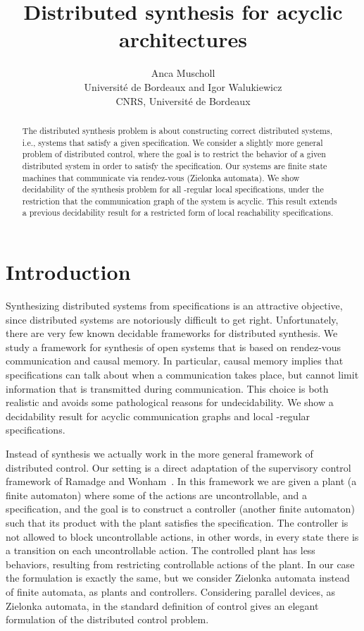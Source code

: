 \documentclass[10pt,a4paper]{article}
\title{Distributed synthesis for acyclic architectures}
\author{Anca Muscholl\\ Universit\'e de Bordeaux and Igor Walukiewicz\\CNRS, Universit\'e de Bordeaux}
\newcommand{\igw}[1]{}
\begin{document}
\maketitle

\begin{abstract}
  The distributed synthesis problem is about constructing correct
  distributed systems, i.e., systems that satisfy a given
  specification. We consider  a slightly more general problem of
  distributed control, where the goal is to restrict the behavior
  of a given distributed system in order to satisfy the
  specification. Our systems are finite state machines that
  communicate via rendez-vous (Zielonka automata). We show
  decidability of the synthesis problem for all -regular local
  specifications, under the restriction that the communication graph
  of the system is acyclic. This result extends a previous
  decidability result for a restricted form of local reachability 
  specifications.

\end{abstract}



\section{Introduction}

\igw{update Intro}
Synthesizing distributed systems from specifications is an attractive
objective, since distributed systems are notoriously difficult to get
right. Unfortunately, there are very few known decidable frameworks
for distributed synthesis. We study a framework for synthesis
of open systems that is based on rendez-vous communication and causal
memory. In particular, causal memory implies that specifications can talk about
when a communication takes place, but cannot limit information that is
transmitted during communication. This choice is both realistic and
avoids some pathological reasons for undecidability. We show
a decidability result for acyclic communication graphs and local
-regular specifications.


Instead of synthesis we actually work in the more general framework of
distributed control. Our setting is a direct adaptation of the
supervisory control framework of Ramadge and Wonham~\cite{RW89}. In
this framework we are given a plant (a finite automaton) where some of
the actions are uncontrollable, and a specification, and the goal is to
construct a controller (another finite automaton) such that its
product with the plant satisfies the specification. The controller is
not allowed to block uncontrollable actions, in other words, in every state there is a
transition on each uncontrollable action. The controlled plant has
less behaviors, resulting from restricting
controllable actions of the plant.  In our case the formulation is
exactly the same, but we consider Zielonka automata instead of finite
automata, as plants and controllers. Considering parallel devices, as
Zielonka automata, in the standard definition of control gives an
elegant formulation of the distributed control problem.
\end{document}
